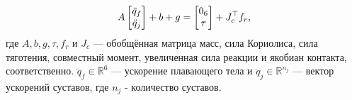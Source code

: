 \begin{equation}
	A \begin{bmatrix}
		\ddot{{q}}_f \\ \ddot{{q}}_j
	\end{bmatrix}
	+ b +g =
	\begin{bmatrix}
		0_6 \\ \tau
	\end{bmatrix} +
	J_c^\top f_r,
\end{equation}
где $A, b, g, \tau, f_r $ и $J_c$ --- обобщённая матрица масс, сила Кориолиса, сила тяготения, совместный момент, увеличенная сила реакции и якобиан контакта, соответственно. $\ddot{{q}}_f \in \mathbb{R}^{6}$ --- ускорение плавающего тела и  $\ddot{{q}}_j \in \mathbb{R}^{n_j}$ --- вектор ускорений суставов, где $n_j$ - количество суставов.
\FloatBarrier
